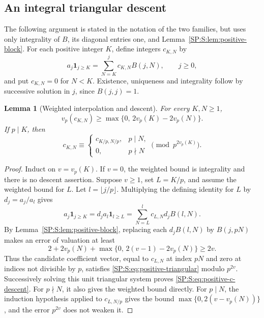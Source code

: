 \documentclass[11pt,a4paper]{article}
\newtheorem{lemma}[theorem]{Lemma}
\theoremstyle{definition}\newtheorem{definition}[theorem]{Definition}
\theoremstyle{remark}\newtheorem{remark}[theorem]{Remark}
\numberwithin{equation}{section}
\begin{document}
\subsection{An integral triangular descent}

The following argument is stated in the notation of the two
families, but uses only integrality of \(B\), its diagonal entries
one, and Lemma~\ref{SP:S:lem:positive-block}.
For each positive integer \(K\), define integers \(c_{K,N}\) by
\begin{equation}\label{SP:S:eq:positive-triangular}
 a_j\mathbf1_{j\geq K}
 =\sum_{N=K}^{j}c_{K,N}B(j,N),\qquad j\geq0,
\end{equation}
and put \(c_{K,N}=0\) for \(N<K\).
Existence, uniqueness and integrality follow by successive solution
in \(j\), since \(B(j,j)=1\).

\begin{lemma}[Weighted interpolation and descent]
\label{SP:S:lem:positive-descent}
For every \(K,N\geq1\),
\begin{equation}\label{SP:S:eq:positive-c-weight}
 v_p(c_{K,N})\geq
 \max\{0,\,2v_p(K)-2v_p(N)\}.
\end{equation}
If \(p\mid K\), then
\begin{equation}\label{SP:S:eq:positive-c-descent}
 c_{K,N}\equiv
 \begin{cases}
 c_{K/p,N/p},&p\mid N,\\
 0,&p\nmid N
 \end{cases}
 \pmod{p^{2v_p(K)}}.
\end{equation}
\end{lemma}

\begin{proof}
Induct on \(v=v_p(K)\).  If \(v=0\), the weighted bound
is integrality and there is no descent assertion.
Suppose \(v\geq1\), set \(L=K/p\), and assume the weighted
bound for \(L\).  Let \(l=\lfloor j/p\rfloor\).
Multiplying the defining identity for \(L\) by \(d_j=a_j/a_l\)
gives
\[
 a_j\mathbf1_{j\geq K}
 =d_ja_l\mathbf1_{l\geq L}
 =\sum_{N=L}^{l}c_{L,N}d_jB(l,N).
\]
By Lemma~\ref{SP:S:lem:positive-block}, replacing each
\(d_jB(l,N)\) by \(B(j,pN)\) makes an error of valuation at
least
\[
 2+2v_p(N)+\max\{0,\,2(v-1)-2v_p(N)\}\geq2v.
\]
Thus the candidate coefficient vector, equal to \(c_{L,N}\)
at index \(pN\) and zero at indices not divisible by \(p\),
satisfies \eqref{SP:S:eq:positive-triangular} modulo \(p^{2v}\).
Successively solving this unit triangular system proves
\eqref{SP:S:eq:positive-c-descent}.
For \(p\nmid N\), it also gives the weighted bound directly.
For \(p\mid N\), the induction hypothesis applied to
\(c_{L,N/p}\) gives the bound
\(\max\{0,2(v-v_p(N))\}\), and the error \(p^{2v}\)
does not weaken it.
\end{proof}
\end{document}
